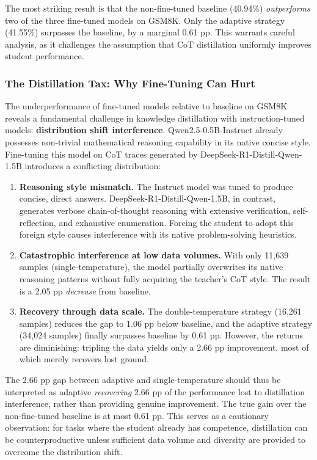 \documentclass{article}
\begin{document}
The most striking result is that the non-fine-tuned baseline (40.94\%) \textit{outperforms} two of the three fine-tuned models on GSM8K. Only the adaptive strategy (41.55\%) surpasses the baseline, by a marginal 0.61 pp. This warrants careful analysis, as it challenges the assumption that CoT distillation uniformly improves student performance.

\subsubsection{The Distillation Tax: Why Fine-Tuning Can Hurt}

The underperformance of fine-tuned models relative to baseline on GSM8K reveals a fundamental challenge in knowledge distillation with instruction-tuned models: \textbf{distribution shift interference}. Qwen2.5-0.5B-Instruct already possesses non-trivial mathematical reasoning capability in its native concise style. Fine-tuning this model on CoT traces generated by DeepSeek-R1-Distill-Qwen-1.5B introduces a conflicting distribution:

\begin{enumerate}[leftmargin=*]
    \item \textbf{Reasoning style mismatch.} The Instruct model was tuned to produce concise, direct answers. DeepSeek-R1-Distill-Qwen-1.5B, in contrast, generates verbose chain-of-thought reasoning with extensive verification, self-reflection, and exhaustive enumeration. Forcing the student to adopt this foreign style causes interference with its native problem-solving heuristics.
    \item \textbf{Catastrophic interference at low data volumes.} With only 11,639 samples (single-temperature), the model partially overwrites its native reasoning patterns without fully acquiring the teacher's CoT style. The result is a 2.05 pp \textit{decrease} from baseline.
    \item \textbf{Recovery through data scale.} The double-temperature strategy (16,261 samples) reduces the gap to 1.06 pp below baseline, and the adaptive strategy (34,024 samples) finally surpasses baseline by 0.61 pp. However, the returns are diminishing: tripling the data yields only a 2.66 pp improvement, most of which merely recovers lost ground.
\end{enumerate}

The 2.66 pp gap between adaptive and single-temperature should thus be interpreted as adaptive \textit{recovering} 2.66 pp of the performance lost to distillation interference, rather than providing genuine improvement. The true gain over the non-fine-tuned baseline is at most 0.61 pp. This serves as a cautionary observation: for tasks where the student already has competence, distillation can be counterproductive unless sufficient data volume and diversity are provided to overcome the distribution shift.
\end{document}
